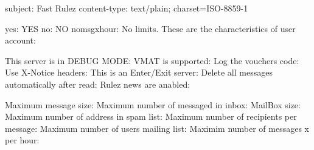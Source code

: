subject: Fast Rulez
content-type: text/plain; charset=ISO-8859-1 

yes: YES
no: NO
nomsgxhour: No limits.
These are the characteristics of user account:

This server is in DEBUG MODE: 			%
VMAT is supported: 				%
Log the vouchers code: 				%
Use X-Notice headers: 				%
This is an Enter/Exit server: 			%
Delete all messages automatically after read: 	%
Rulez news are anabled:				%

Maximum message size: 				%
Maximum number of messaged in inbox: 		%
MailBox size:					%
Maximum number of address in spam list: 	%
Maximum number of recipients per message: 	%
Maximum number of users mailing list: 		%
Maximim number of messages x per hour:		%
	